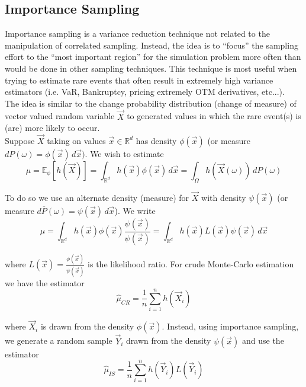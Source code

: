 \documentclass[12pt]{article}
\newlength\tindent
\renewcommand{\indent}{\hspace*{\tindent}}
\begin{document}
\subsection{Importance Sampling}

\indent Importance sampling is a variance reduction technique not related to the manipulation of correlated sampling. Instead, the idea is to ``focus'' the sampling effort to the ``most important region'' for the simulation problem more often than would be done in other sampling techniques. This technique is most useful when trying to estimate rare events that often result in extremely high variance estimators (i.e. VaR, Bankruptcy, pricing extremely OTM derivatives, etc...). \\

\indent The idea is similar to the change probability distribution (change of measure) of vector valued random variable $\vec{X}$ to generated values in which the rare event(s) is (are) more likely to occur. \\

\indent Suppose $\vec{X}$ taking on values $\vec{x}\in\mathbb R^d$ has density $\phi(\vec{x})$ (or measure $dP(\omega) = \phi(\vec{x})\,d\vec{x})$. We wish to estimate
\begin{equation*}
	\mu = \mathbb E_{\phi}[h(\vec{X})] = \int_{\mathbb R^d} h(\vec{x})\phi(\vec{x})\,d\vec{x} = \int_\Omega h(\vec{X}(\omega))\,dP(\omega)
\end{equation*}

\indent To do so we use an alternate density (measure) for $\vec{X}$ with density $\psi(\vec{x})$ (or measure $d\overline{P}(\omega) = \psi(\vec{x})\,d\vec{x}$). We write
\begin{equation*}
	\mu = \int_{\mathbb R^d} h(\vec{x})\phi(\vec{x})\frac{\psi(\vec{x})}{\psi(\vec{x})} = \int_{\mathbb R^d} h(\vec{x})L(\vec{x})\psi(\vec{x})\,d\vec{x}
\end{equation*}

where $L(\vec{x}) = \frac{\phi(\vec{x})}{\psi(\vec{x})}$ is the likelihood ratio. For crude Monte-Carlo estimation we have the estimator
\begin{equation*}
	\hat{\mu}_{CR} = \frac{1}{n} \sum^n_{i=1} h(\vec{X}_i)
\end{equation*}

where $\vec{X}_i$ is drawn from the density $\phi(\vec{x})$. Instead, using importance sampling, we generate a random sample $\vec{Y}_i$ drawn from the density $\psi(\vec{x})$ and use the estimator
\begin{equation*}
	\hat{\mu}_{IS} = \frac{1}{n} \sum^n_{i=1} h(\vec{Y}_i)L(\vec{Y}_i)
\end{equation*}
\end{document}
